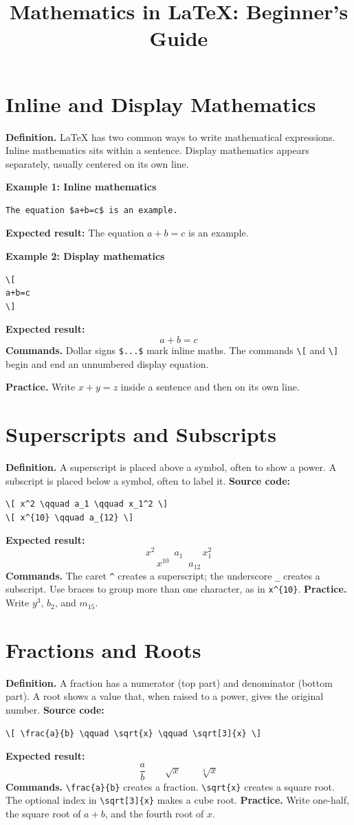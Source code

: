 \documentclass[11pt]{article}
\title{Mathematics in LaTeX: Beginner's Guide}
\author{}
\date{}
\begin{document}
\maketitle
\tableofcontents
\bigskip

\section{Inline and Display Mathematics}
\textbf{Definition.} LaTeX has two common ways to write mathematical expressions. Inline mathematics sits within a sentence. Display mathematics appears separately, usually centered on its own line.

\textbf{Example 1: Inline mathematics}
\begin{verbatim}
The equation $a+b=c$ is an example.
\end{verbatim}
\textbf{Expected result:} The equation $a+b=c$ is an example.

\textbf{Example 2: Display mathematics}
\begin{verbatim}
\[
a+b=c
\]
\end{verbatim}
\textbf{Expected result:}
\[
a+b=c
\]
\textbf{Commands.} Dollar signs \verb|$...$| mark inline maths. The commands \verb|\[| and \verb|\]| begin and end an unnumbered display equation.

\textbf{Practice.} Write $x+y=z$ inside a sentence and then on its own line.

\section{Superscripts and Subscripts}
\textbf{Definition.} A superscript is placed above a symbol, often to show a power. A subscript is placed below a symbol, often to label it.
\textbf{Source code:}
\begin{verbatim}
\[ x^2 \qquad a_1 \qquad x_1^2 \]
\[ x^{10} \qquad a_{12} \]
\end{verbatim}
\textbf{Expected result:}
\[ x^2 \qquad a_1 \qquad x_1^2 \]
\[ x^{10} \qquad a_{12} \]
\textbf{Commands.} The caret \verb|^| creates a superscript; the underscore \verb|_| creates a subscript. Use braces to group more than one character, as in \verb|x^{10}|.
\textbf{Practice.} Write $y^3$, $b_2$, and $m_{15}$.

\section{Fractions and Roots}
\textbf{Definition.} A fraction has a numerator (top part) and denominator (bottom part). A root shows a value that, when raised to a power, gives the original number.
\textbf{Source code:}
\begin{verbatim}
\[ \frac{a}{b} \qquad \sqrt{x} \qquad \sqrt[3]{x} \]
\end{verbatim}
\textbf{Expected result:}
\[ \frac{a}{b} \qquad \sqrt{x} \qquad \sqrt[3]{x} \]
\textbf{Commands.} \verb|\frac{a}{b}| creates a fraction. \verb|\sqrt{x}| creates a square root. The optional index in \verb|\sqrt[3]{x}| makes a cube root.
\textbf{Practice.} Write one-half, the square root of $a+b$, and the fourth root of $x$.
\end{document}
